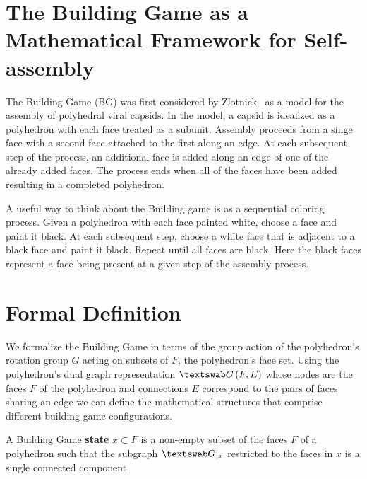 \label{chp:bgm}
\section{The Building Game as a Mathematical Framework for Self-assembly}

The Building Game (BG) was first considered by Zlotnick~\cite{Zlotnick1994} as a model for the assembly of polyhedral viral capsids. In the model, a capsid is idealized as a polyhedron with each face treated as a subunit. Assembly proceeds from a singe face with a second face attached to the first along an edge. At each subsequent step of the process, an additional face is added along an edge of one of the already added faces. The process ends when all of the faces have been added resulting in a completed polyhedron.

A useful way to think about the Building game is as a sequential coloring process. Given a polyhedron with each face painted white, choose a face and paint it black. At each subsequent step, choose a white face that is adjacent to a black face and paint it black. Repeat until all faces are black. Here the black faces represent a face being present at a given step of the assembly process.



\section{Formal Definition}
We formalize the Building Game in terms of the group action of the polyhedron's rotation group $G$ acting on subsets of $F$, the polyhedron's face set. Using the polyhedron's dual graph representation $\PolyGraph\left(F, E\right)$ whose nodes are the faces $F$ of the polyhedron and connections $E$ correspond to the pairs of faces sharing an edge we can define the mathematical structures that comprise different building game configurations.



\begin{mydef}
  A Building Game \textbf{state} $x \subset F$ is a non-empty subset of the faces $F$ of a polyhedron such that the subgraph $\PolyGraph|_x$ restricted to the faces in $x$ is a single connected component. 
\end{mydef} 

